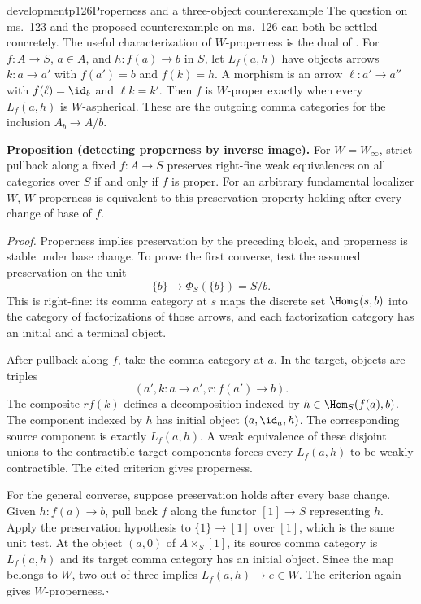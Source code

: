 \begin{dcomment}{development}{p126}{Properness and a three-object counterexample}
The question on ms.~123 and the proposed counterexample on ms.~126 can both be settled concretely. The useful characterization of $W$-properness is the dual of \citet[Theorem~1.2(b)]{Maltsiniotis2005Asphericite}. For $f:A\to S$, $a\in A$, and $h:f(a)\to b$ in $S$, let $L_f(a,h)$ have objects arrows $k:a\to a'$ with $f(a')=b$ and $f(k)=h$. A morphism is an arrow $\ell:a'\to a''$ with $f(\ell)=\id_b$ and $\ell k=k'$. Then $f$ is $W$-proper exactly when every $L_f(a,h)$ is $W$-aspherical. These are the outgoing comma categories for the inclusion $A_b\to A/b$.

\textbf{Proposition (detecting properness by inverse image).}\ours
For $W=W_\infty$, strict pullback along a fixed $f:A\to S$ preserves right-fine weak equivalences on all categories over $S$ if and only if $f$ is proper. For an arbitrary fundamental localizer $W$, $W$-properness is equivalent to this preservation property holding after every change of base of $f$.

\textit{Proof.} Properness implies preservation by the preceding block, and properness is stable under base change. To prove the first converse, test the assumed preservation on the unit
\[
 \{b\}\longrightarrow\Phi_S(\{b\})=S/b.
\]
This is right-fine: its comma category at $s$ maps the discrete set $\Hom_S(s,b)$ into the category of factorizations of those arrows, and each factorization category has an initial and a terminal object.

After pullback along $f$, take the comma category at $a$. In the target, objects are triples
\[
 (a',k:a\to a',r:f(a')\to b).
\]
The composite $r f(k)$ defines a decomposition indexed by $h\in\Hom_S(f(a),b)$. The component indexed by $h$ has initial object $(a,\id_a,h)$. The corresponding source component is exactly $L_f(a,h)$. A weak equivalence of these disjoint unions to the contractible target components forces every $L_f(a,h)$ to be weakly contractible. The cited criterion gives properness.

For the general converse, suppose preservation holds after every base change. Given $h:f(a)\to b$, pull back $f$ along the functor $[1]\to S$ representing $h$. Apply the preservation hypothesis to $\{1\}\to[1]$ over $[1]$, which is the same unit test. At the object $(a,0)$ of $A\times_S[1]$, its source comma category is $L_f(a,h)$ and its target comma category has an initial object. Since the map belongs to $W$, two-out-of-three implies $L_f(a,h)\to e\in W$. The criterion again gives $W$-properness.\hfill$\square$


\end{dcomment}
